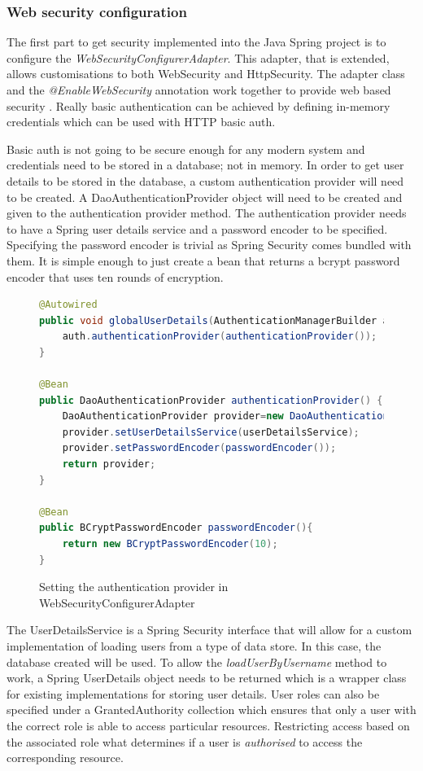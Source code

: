 \subsubsection{Web security configuration}
The first part to get security implemented into the Java Spring project is to configure the \textit{WebSecurityConfigurerAdapter}.
This adapter, that is extended, allows customisations to both WebSecurity and HttpSecurity.
The adapter class and the \textit{@EnableWebSecurity} annotation work together to provide web based security \cite{winch2013springsecurity}.
Really basic authentication can be achieved by defining in-memory credentials which can be used with HTTP basic auth.

Basic auth is not going to be secure enough for any modern system and credentials need to be stored in a database; not in memory.
In order to get user details to be stored in the database, a custom authentication provider will need to be created.
A DaoAuthenticationProvider object will need to be created and given to the authentication provider method.
The authentication provider needs to have a Spring user details service and a password encoder to be specified.
Specifying the password encoder is trivial as Spring Security comes bundled with them. 
It is simple enough to just create a bean that returns a bcrypt password encoder that uses ten rounds of encryption.


\begin{figure}[ht]
    \centering
    \begin{lstlisting}[language=Java]
@Autowired
public void globalUserDetails(AuthenticationManagerBuilder auth) {
    auth.authenticationProvider(authenticationProvider());
}

@Bean
public DaoAuthenticationProvider authenticationProvider() {
    DaoAuthenticationProvider provider=new DaoAuthenticationProvider();
    provider.setUserDetailsService(userDetailsService);
    provider.setPasswordEncoder(passwordEncoder());
    return provider;
}       

@Bean
public BCryptPasswordEncoder passwordEncoder(){
    return new BCryptPasswordEncoder(10);
}
    \end{lstlisting}
    \caption{Setting the authentication provider in WebSecurityConfigurerAdapter}
    \label{settingauthprovider}
\end{figure}

The UserDetailsService is a Spring Security interface that will allow for a custom implementation of loading users from a type of data store.
In this case, the database created will be used.
To allow the \textit{loadUserByUsername} method to work, a Spring UserDetails object needs to be returned which is a wrapper class for
existing implementations for storing user details.
User roles can also be specified under a GrantedAuthority collection which ensures that only a user with the correct role is able to 
access particular resources.
Restricting access based on the associated role what determines if a user is \textit{authorised} to access the corresponding resource.

